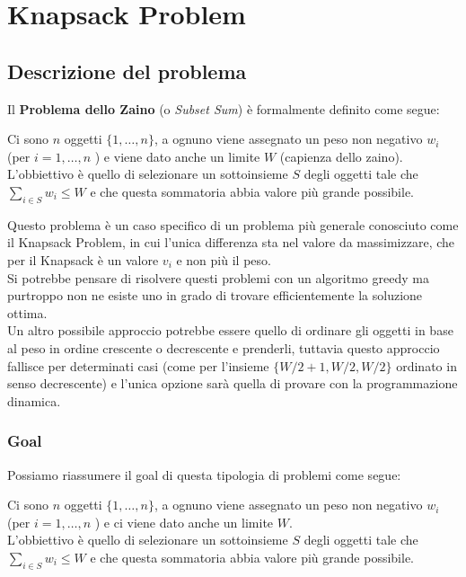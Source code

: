 \chapter{Knapsack Problem}

\section{Descrizione del problema}

Il \textbf{Problema dello Zaino} (o \emph{Subset Sum}) è formalmente
definito come segue:

\begin{myblockquote}
  Ci sono $n$ oggetti $\{1, \ldots, n\}$, a ognuno viene assegnato un
  peso non negativo $w_i$ (per $i = 1, \ldots, n$ ) e viene dato anche
  un limite $W$ (capienza dello zaino).\\ L'obbiettivo è quello di
  selezionare un sottoinsieme $S$ degli oggetti tale che
  $\sum_{i \in S}w_i \leq W$ e che questa sommatoria abbia valore più
  grande possibile.
\end{myblockquote}

Questo problema è un caso specifico di un problema più generale
conosciuto come il Knapsack Problem, in cui l'unica differenza sta nel
valore da massimizzare, che per il Knapsack è un valore $v_i$ e non
più il peso.\\

Si potrebbe pensare di risolvere questi problemi con un algoritmo greedy
ma purtroppo non ne esiste uno in grado di trovare efficientemente la
soluzione ottima.\\

Un altro possibile approccio potrebbe essere quello di
ordinare gli oggetti in base al peso in ordine crescente o decrescente e
prenderli, tuttavia questo approccio fallisce per determinati casi (come
per l'insieme $\{W/2+1, W/2, W/2\}$ ordinato in senso decrescente) e
l'unica opzione sarà quella di provare con la programmazione dinamica.


\subsection{Goal}

Possiamo riassumere il goal di questa tipologia di problemi come segue:
\begin{myblockquote}
  Ci sono $n$ oggetti $\{1, \ldots, n\}$, a ognuno
  viene assegnato un peso non negativo $w_i$ (per $i = 1, \ldots, n$ )
  e ci viene dato anche un limite $W$.\\  L'obbiettivo è
  quello di selezionare un sottoinsieme $S$ degli oggetti tale che
  $\sum_{i \in S}w_i \leq W$ e che questa sommatoria abbia valore più
  grande possibile.
\end{myblockquote}


